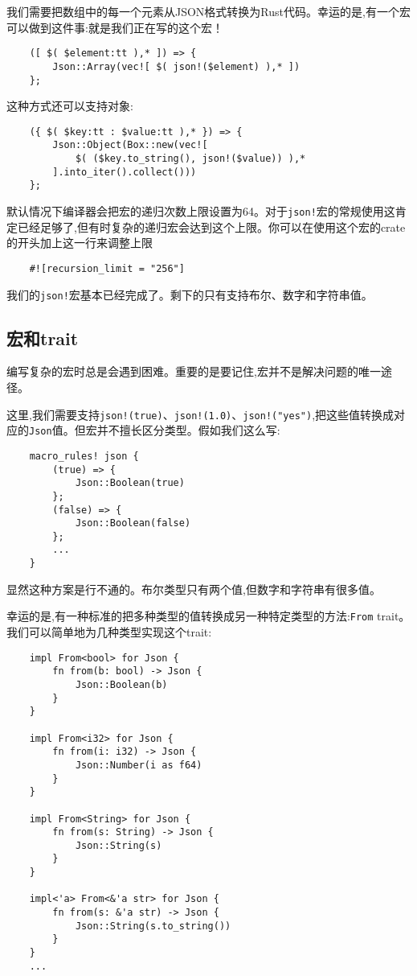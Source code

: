 我们需要把数组中的每一个元素从JSON格式转换为Rust代码。幸运的是,有一个宏可以做到这件事:就是我们正在写的这个宏！
\begin{verbatim}
    ([ $( $element:tt ),* ]) => {
        Json::Array(vec![ $( json!($element) ),* ])
    };
\end{verbatim}

这种方式还可以支持对象:
\begin{verbatim}
    ({ $( $key:tt : $value:tt ),* }) => {
        Json::Object(Box::new(vec![
            $( ($key.to_string(), json!($value)) ),*
        ].into_iter().collect()))
    };
\end{verbatim}

默认情况下编译器会把宏的递归次数上限设置为64。对于\texttt{json!}宏的常规使用这肯定已经足够了,但有时复杂的递归宏会达到这个上限。你可以在使用这个宏的crate的开头加上这一行来调整上限
\begin{verbatim}
    #![recursion_limit = "256"]
\end{verbatim}
我们的\texttt{json!}宏基本已经完成了。剩下的只有支持布尔、数字和字符串值。

\subsection{宏和trait}
编写复杂的宏时总是会遇到困难。重要的是要记住,宏并不是解决问题的唯一途径。

这里,我们需要支持\texttt{json!(true)}、\texttt{json!(1.0)}、\texttt{json!("yes")},把这些值转换成对应的\texttt{Json}值。但宏并不擅长区分类型。假如我们这么写:
\begin{verbatim}
    macro_rules! json {
        (true) => {
            Json::Boolean(true)
        };
        (false) => {
            Json::Boolean(false)
        };
        ...
    }
\end{verbatim}

显然这种方案是行不通的。布尔类型只有两个值,但数字和字符串有很多值。

幸运的是,有一种标准的把多种类型的值转换成另一种特定类型的方法:\texttt{From} trait。我们可以简单地为几种类型实现这个trait:
\begin{verbatim}
    impl From<bool> for Json {
        fn from(b: bool) -> Json {
            Json::Boolean(b)
        }
    }

    impl From<i32> for Json {
        fn from(i: i32) -> Json {
            Json::Number(i as f64)
        }
    }

    impl From<String> for Json {
        fn from(s: String) -> Json {
            Json::String(s)
        }
    }

    impl<'a> From<&'a str> for Json {
        fn from(s: &'a str) -> Json {
            Json::String(s.to_string())
        }
    }
    ...
\end{verbatim}


